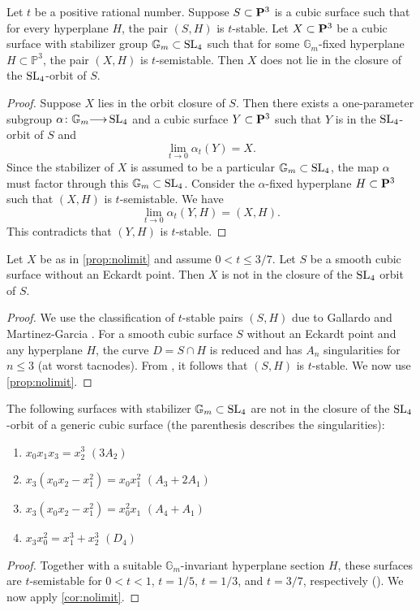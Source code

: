 \documentclass[12pt,reqno]{amsart}
\renewcommand{\to}{{\longrightarrow}}
\numberwithin{equation}{section}
\begin{document}
\begin{proposition}\label{prop:nolimit}
  Let $t$ be a positive rational number.
  Suppose $S \subset \P^3$ is a cubic surface such that for every hyperplane $H$, the pair $(S,H)$ is $t$-stable.
  Let $X \subset \P^3$ be a cubic surface with stabilizer group $\mathbb G_m \subset \SL_4$ such that for some $\mathbb G_m$-fixed hyperplane $H \subset \mathbb P^3$, the pair $(X, H)$ is $t$-semistable.
  Then $X$ does not lie in the closure of the $\SL_4$-orbit of $S$.
\end{proposition}
\begin{proof}
  Suppose $X$ lies in the orbit closure of $S$.
  Then there exists a one-parameter subgroup $\alpha \colon \mathbb G_m \to \SL_4$ and a cubic surface $Y \subset \P^3$ such that $Y$ is in the $\SL_4$-orbit of $S$ and
  \[ \lim_{t \to 0} \alpha_t(Y) = X.\]
  Since the stabilizer of $X$ is assumed to be a particular $\mathbb G_m \subset \SL_4$, the map $\alpha$ must factor through this $\mathbb G_m \subset \SL_4$.
  Consider the $\alpha$-fixed hyperplane $H \subset \P^3$ such that $(X, H)$ is $t$-semistable.
  We have
  \[ \lim_{t \to 0} \alpha_t(Y, H) = (X, H).\]
  This contradicts that $(Y, H)$ is $t$-stable.
\end{proof}
\begin{corollary}\label{cor:nolimit}
  Let $X$ be as in \autoref{prop:nolimit} and assume $0 < t \leq 3/7$.
  Let $S$ be a smooth cubic surface without an Eckardt point.
  Then $X$ is not in the closure of the $\SL_4$ orbit of $S$.
\end{corollary}
\begin{proof}
  We use the classification of $t$-stable pairs $(S,H)$ due to Gallardo and Martinez-Garcia \cite{gal.mar:19}.
  For a smooth cubic surface $S$ without an Eckardt point and any hyperplane $H$, the curve $D = S \cap H$ is reduced and has $A_n$ singularities for $n \leq 3$ (at worst tacnodes).
  From \cite[Theorem~2]{gal.mar:19}, it follows that $(S, H)$ is $t$-stable.
  We now use \autoref{prop:nolimit}.
\end{proof}

\begin{corollary}
  The following surfaces with stabilizer $\mathbb G_m \subset \SL_4$ are not in the closure of the $\SL_4$-orbit of a generic cubic surface (the parenthesis describes the singularities):
  \begin{enumerate}
  \item $x_0x_1x_3 = x_2^3$ \quad $(3A_2)$
  \item $x_3(x_0x_2-x_1^2) = x_0x_1^2$ \quad $(A_3 + 2A_1)$
  \item $x_3(x_0x_2-x_1^2) = x_0^2x_1$ \quad $(A_4 + A_1)$
  \item $x_3x_0^2 = x_1^3 + x_2^3$ \quad $(D_4)$
  \end{enumerate}
\end{corollary}
\begin{proof}
  Together with a suitable $\mathbb G_m$-invariant hyperplane section $H$, these surfaces are $t$-semistable for $0 < t < 1$, $t = 1/5$, $t = 1/3$, and $t = 3/7$, respectively (\cite[Table~2]{gal.mar:19}).
  We now apply \autoref{cor:nolimit}.
\end{proof}
\end{document}
